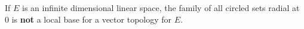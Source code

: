 If $E$ is an infinite dimensional linear space, the family of all circled sets radial at $0$ is \textbf{not} a local base for a vector topology for $E$.
